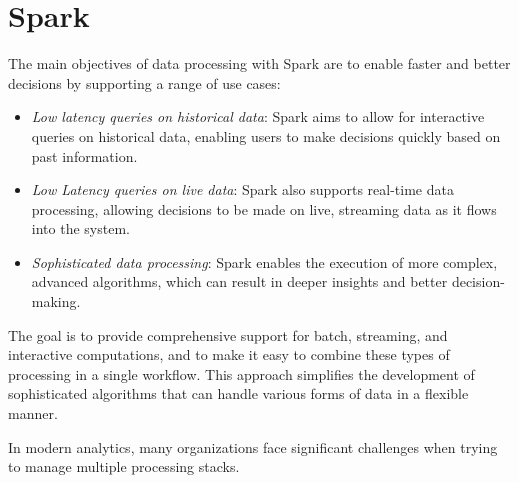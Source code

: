 \section{Spark}

The main objectives of data processing with Spark are to enable faster and better decisions by supporting a range of use cases:
\begin{itemize}
    \item \textit{Low latency queries on historical data}: Spark aims to allow for interactive queries on historical data, enabling users to make decisions quickly based on past information.
    \item \textit{Low Latency queries on live data}: Spark also supports real-time data processing, allowing decisions to be made on live, streaming data as it flows into the system.
    \item \textit{Sophisticated data processing}: Spark enables the execution of more complex, advanced algorithms, which can result in deeper insights and better decision-making.
\end{itemize}
\noindent The goal is to provide comprehensive support for batch, streaming, and interactive computations, and to make it easy to combine these types of processing in a single workflow. 
This approach simplifies the development of sophisticated algorithms that can handle various forms of data in a flexible manner.

In modern analytics, many organizations face significant challenges when trying to manage multiple processing stacks. 

